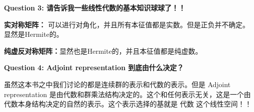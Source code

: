 \textbf{Question 3: 请告诉我一些线性代数的基本知识球球了！！}

\textbf{实对称矩阵：} 可以进行对角化，并且所有本征值都是实数。但是正负并不确定。显然是Hermite的。

\textbf{纯虚反对称矩阵：}显然也是Hermite的，并且本征值都是纯虚数。

\textbf{Question 4: Adjoint representation 到底由什么决定？}

虽然这本书之中我们讨论的都是连续群的表示和代数的表示。但是 Adjoint representation 是由代数和群乘法结构决定的。这个和任何表示无关，这是一个由代数本身结构决定的自然的表示。这个表示选择的基就是 代数 这个线性空间！！






